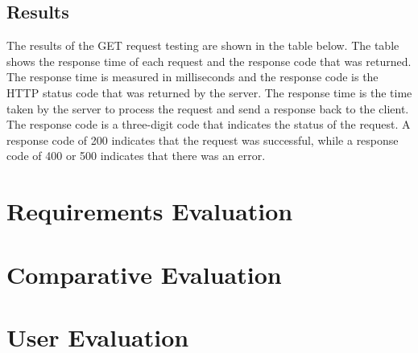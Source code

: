 \subsection*{Results}
The results of the GET request testing are shown in the table below. The table shows the response time of each request and the response code that was returned. The response time is measured in milliseconds and the response code is the HTTP status code that was returned by the server. The response time is the time taken by the server to process the request and send a response back to the client. The response code is a three-digit code that indicates the status of the request. A response code of 200 indicates that the request was successful, while a response code of 400 or 500 indicates that there was an error.

\section{Requirements Evaluation}

\section{Comparative Evaluation}

\section{User Evaluation}